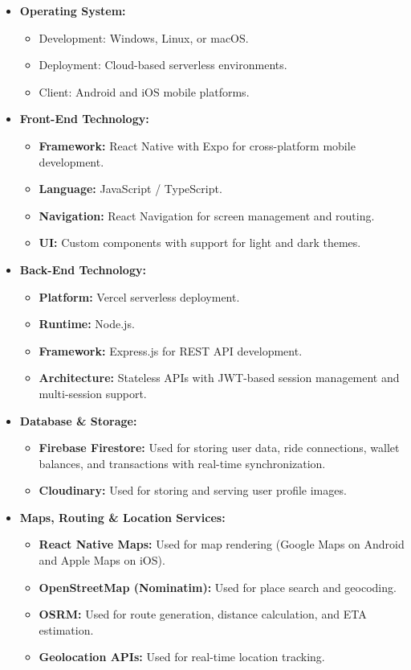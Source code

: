 \documentclass[10pt,a4paper]{report}
\begin{document}
\begin{itemize}
    \item \textbf{Operating System:}
    \begin{itemize}
        \item Development: Windows, Linux, or macOS.
        \item Deployment: Cloud-based serverless environments.
        \item Client: Android and iOS mobile platforms.
    \end{itemize}

    \item \textbf{Front-End Technology:}
    \begin{itemize}
        \item \textbf{Framework:} React Native with Expo for cross-platform mobile development.
        \item \textbf{Language:} JavaScript / TypeScript.
        \item \textbf{Navigation:} React Navigation for screen management and routing.
        \item \textbf{UI:} Custom components with support for light and dark themes.
    \end{itemize}

    \item \textbf{Back-End Technology:}
    \begin{itemize}
        \item \textbf{Platform:} Vercel serverless deployment.
        \item \textbf{Runtime:} Node.js.
        \item \textbf{Framework:} Express.js for REST API development.
        \item \textbf{Architecture:} Stateless APIs with JWT-based session management and multi-session support.
    \end{itemize}

    \item \textbf{Database \& Storage:}
    \begin{itemize}
        \item \textbf{Firebase Firestore:} Used for storing user data, ride connections, wallet balances, and transactions with real-time synchronization.
        \item \textbf{Cloudinary:} Used for storing and serving user profile images.
    \end{itemize}

    \item \textbf{Maps, Routing \& Location Services:}
    \begin{itemize}
        \item \textbf{React Native Maps:} Used for map rendering (Google Maps on Android and Apple Maps on iOS).
        \item \textbf{OpenStreetMap (Nominatim):} Used for place search and geocoding.
        \item \textbf{OSRM:} Used for route generation, distance calculation, and ETA estimation.
        \item \textbf{Geolocation APIs:} Used for real-time location tracking.
    \end{itemize}


\end{itemize}
\end{document}
